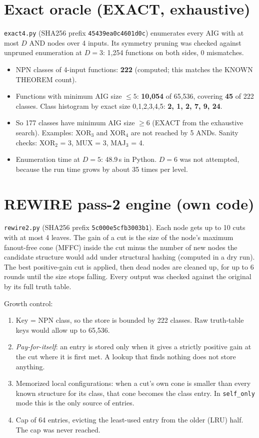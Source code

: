 \documentclass[11pt]{article}
\begin{document}
\section{Exact oracle (EXACT, exhaustive)}
\texttt{exact4.py} (SHA256 prefix \texttt{45439ea0c4601d0c}) enumerates every AIG with at most $D$ AND nodes over 4 inputs. Its symmetry pruning was checked against unpruned enumeration at $D=3$: 1{,}254 functions on both sides, 0 mismatches.
\begin{itemize}
\item NPN classes of 4-input functions: \textbf{222} (computed; this matches the KNOWN THEOREM count).
\item Functions with minimum AIG size $\le5$: \textbf{10{,}054} of 65{,}536, covering \textbf{45} of 222 classes. Class histogram by exact size 0,1,2,3,4,5: \textbf{2, 1, 2, 7, 9, 24}.
\item So 177 classes have minimum AIG size $\ge 6$ (EXACT from the exhaustive search). Examples: XOR$_3$ and XOR$_4$ are not reached by 5 ANDs. Sanity checks: XOR$_2$ = 3, MUX = 3, MAJ$_3$ = 4.
\item Enumeration time at $D=5$: 48.9\,s in Python. $D=6$ was not attempted, because the run time grows by about 35 times per level.
\end{itemize}

\section{REWIRE pass-2 engine (own code)}
\texttt{rewire2.py} (SHA256 prefix \texttt{5c000e5cfb3003b1}). Each node gets up to 10 cuts with at most 4 leaves. The gain of a cut is the size of the node's maximum fanout-free cone (MFFC) inside the cut minus the number of new nodes the candidate structure would add under structural hashing (computed in a dry run). The best positive-gain cut is applied, then dead nodes are cleaned up, for up to 6 rounds until the size stops falling. Every output was checked against the original by its full truth table.

Growth control:
\begin{enumerate}
\item Key = NPN class, so the store is bounded by 222 classes. Raw truth-table keys would allow up to 65{,}536.
\item \emph{Pay-for-itself}: an entry is stored only when it gives a strictly positive gain at the cut where it is first met. A lookup that finds nothing does not store anything.
\item Memorized local configurations: when a cut's own cone is smaller than every known structure for its class, that cone becomes the class entry. In \texttt{self\_only} mode this is the only source of entries.
\item Cap of 64 entries, evicting the least-used entry from the older (LRU) half. The cap was never reached.
\end{enumerate}
\end{document}
